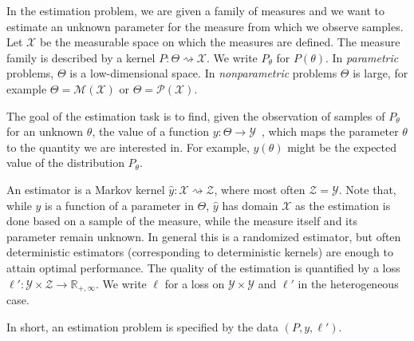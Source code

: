 
In the estimation problem, we are given a family of measures and we want to estimate an unknown parameter for the measure from which we observe samples.
Let $\mathcal X$ be the measurable space on which the measures are defined.
The measure family is described by a kernel $P : \Theta \rightsquigarrow \mathcal X$. We write $P_\theta$ for $P(\theta)$.
In \emph{parametric} problems, $\Theta$ is a low-dimensional space. In \emph{nonparametric} problems $\Theta$ is large, for example $\Theta = \mathcal M (\mathcal X)$ or $\Theta = \mathcal P(\mathcal X)$.

The goal of the estimation task is to find, given the observation of samples of $P_\theta$ for an unknown $\theta$, the value of a function $y : \Theta \to \mathcal Y$~, which maps the parameter $\theta$ to the quantity we are interested in. For example, $y(\theta)$ might be the expected value of the distribution $P_\theta$.

An estimator is a Markov kernel $\hat{y} : \mathcal X \rightsquigarrow \mathcal Z$, where most often $\mathcal Z = \mathcal Y$.
Note that, while $y$ is a function of a parameter in $\Theta$, $\hat{y}$ has domain $\mathcal X$ as the estimation is done based on a sample of the measure, while the measure itself and its parameter remain unknown.
In general this is a randomized estimator, but often deterministic estimators (corresponding to deterministic kernels) are enough to attain optimal performance.
The quality of the estimation is quantified by a loss $\ell' : \mathcal Y \times \mathcal Z \to \mathbb{R}_{+, \infty}$. We write $\ell$ for a loss on $\mathcal Y \times \mathcal Y$ and $\ell'$ in the heterogeneous case.

In short, an estimation problem is specified by the data $(P, y, \ell')$.



